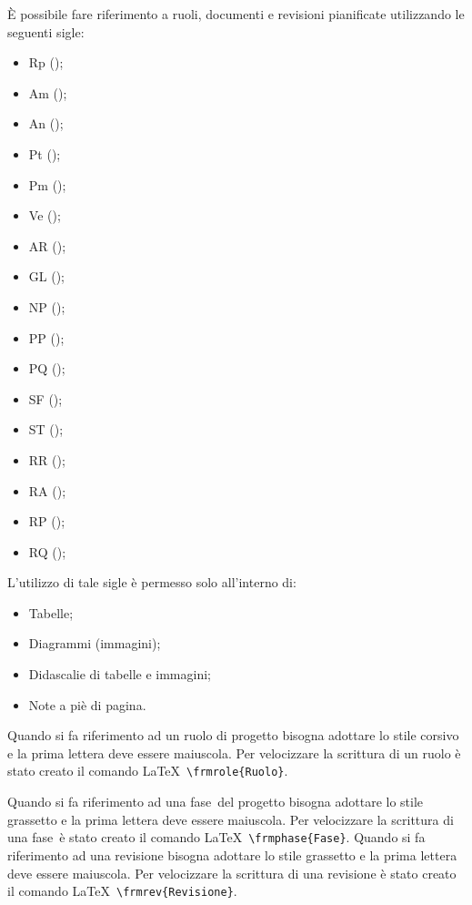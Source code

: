 \documentclass[../NormeProgetto.tex]{subfiles}
\begin{document}
			È possibile fare riferimento a ruoli, documenti e revisioni pianificate utilizzando le seguenti sigle:
			\begin{itemize}
				\item Rp (\responsabilediprogetto);
				\item Am (\amministratore);
				\item An (\analista);
				\item Pt (\progettista);
				\item Pm (\programmatore);
				\item Ve (\verificatore);
				
				\item AR (\analisideirequisiti);
				\item GL (\glossario);
				\item NP (\normediprogetto);
				\item PP (\pianodiprogetto);
				\item PQ (\pianodiqualifica);
				\item SF (\studiodifattibilita);
				\item ST (\specificatecnica);
				
				\item RR (\revisionedeirequisiti);
				\item RA (\revisionediaccettazione);
				\item RP (\revisionediprogettazione);
				\item RQ (\revisionediqualifica);
			\end{itemize}
			L'utilizzo di tale sigle è permesso solo all'interno di:
			\begin{itemize}
				\item Tabelle;
				\item Diagrammi (immagini);
				\item Didascalie di tabelle e immagini;
				\item Note a piè di pagina.
			\end{itemize}
			Quando si fa riferimento ad un ruolo di progetto bisogna adottare lo stile corsivo e la prima lettera deve essere maiuscola. 	 Per velocizzare la scrittura di un ruolo è stato creato il comando \LaTeX\ \texttt{\textbackslash frmrole\{Ruolo\}}. 
			
			Quando si fa riferimento ad una fase\g\ del progetto bisogna adottare lo stile grassetto e la prima lettera deve essere maiuscola.	 Per velocizzare la scrittura di una fase\g\ è stato creato il comando \LaTeX\ \texttt{\textbackslash frmphase\{Fase\}}. 
			Quando si fa riferimento ad una revisione bisogna adottare lo stile grassetto e la prima lettera deve essere maiuscola. Per velocizzare la scrittura di una revisione è stato creato il comando \LaTeX\ \texttt{\textbackslash frmrev\{Revisione\}}.
			
\end{document}
